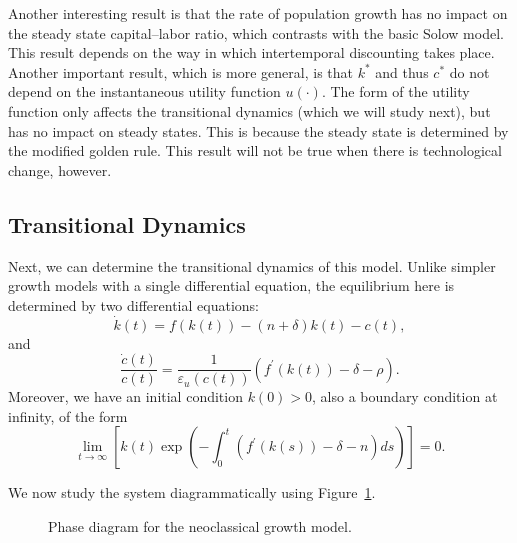 \documentclass[\topdir/lecture\_notes.tex]{subfiles}
\begin{document}
Another interesting result is that the rate of population growth has no impact on the steady state capital--labor ratio, which contrasts with the basic Solow model. This result depends on the way in which intertemporal discounting takes place. Another important result, which is more general, is that \(k^{*}\) and thus \(c^{*}\) do not depend on the instantaneous utility function \(u(\cdot)\). The form of the utility function only affects the transitional dynamics (which we will study next), but has no impact on steady states. This is because the steady state is determined by the modified golden rule. This result will not be true when there is technological change, however.

\subsection{Transitional Dynamics}
Next, we can determine the transitional dynamics of this model. Unlike simpler growth models with a single differential equation, the equilibrium here is determined by two differential equations:
\[
  \dot{k}(t)=f(k(t))-(n+\delta) k(t)-c(t),
\]
and
\[
  \frac{\dot{c}(t)}{c(t)}=\frac{1}{\varepsilon_{u}(c(t))}\left(f^{\prime}(k(t))-\delta-\rho\right).
\]
Moreover, we have an initial condition \(k(0)>0\), also a boundary condition at infinity, of the form
\[
  \lim _{t \rightarrow \infty}\left[k(t) \exp \left(-\int_{0}^{t}\left(f^{\prime}(k(s))-\delta-n\right) ds\right)\right]=0.
\]

We now study the system diagrammatically using Figure~\ref{fig:phase-diagram}.

\begin{figure}[ht]
  \centering
  \caption{Phase diagram for the neoclassical growth model.}
  \label{fig:phase-diagram}
\end{figure}
\end{document}
